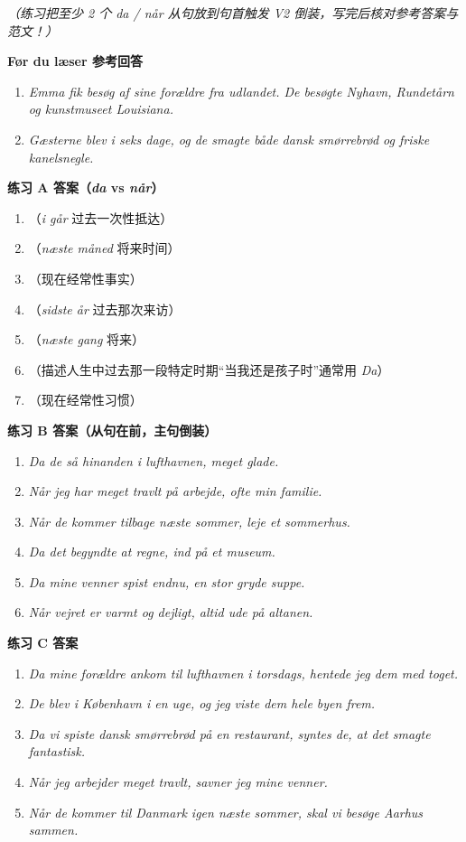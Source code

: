 \textit{（练习把至少 2 个 \textit{da / når} 从句放到句首触发 V2 倒装，写完后核对参考答案与范文！）}

\begin{answerbox}
\textbf{Før du læser 参考回答}
\begin{enumerate}
  \item \textit{Emma fik besøg af sine forældre fra udlandet. De besøgte Nyhavn, Rundetårn og kunstmuseet Louisiana.}
  \item \textit{Gæsterne blev i seks dage, og de smagte både dansk smørrebrød og friske kanelsnegle.}
\end{enumerate}

\textbf{练习 A 答案（\textit{da} vs \textit{når}）}
\begin{enumerate}
  \item {}（\textit{i går} 过去一次性抵达）
  \item {}（\textit{næste måned} 将来时间）
  \item {}（现在经常性事实）
  \item {}（\textit{sidste år} 过去那次来访）
  \item {}（\textit{næste gang} 将来）
  \item {}（描述人生中过去那一段特定时期“当我还是孩子时”通常用 \textit{Da}）
  \item {}（现在经常性习惯）
\end{enumerate}

\textbf{练习 B 答案（从句在前，主句倒装）}
\begin{enumerate}
  \item \textit{Da de så hinanden i lufthavnen,  meget glade.}
  \item \textit{Når jeg har meget travlt på arbejde,  ofte min familie.}
  \item \textit{Når de kommer tilbage næste sommer,  leje et sommerhus.}
  \item \textit{Da det begyndte at regne,  ind på et museum.}
  \item \textit{Da mine venner  spist endnu,  en stor gryde suppe.}
  \item \textit{Når vejret er varmt og dejligt,  altid ude på altanen.}
\end{enumerate}

\textbf{练习 C 答案}
\begin{enumerate}
  \item \textit{Da mine forældre ankom til lufthavnen i torsdags, hentede jeg dem med toget.}
  \item \textit{De blev i København i en uge, og jeg viste dem hele byen frem.}
  \item \textit{Da vi spiste dansk smørrebrød på en restaurant, syntes de, at det smagte fantastisk.}
  \item \textit{Når jeg arbejder meget travlt, savner jeg mine venner.}
  \item \textit{Når de kommer til Danmark igen næste sommer, skal vi besøge Aarhus sammen.}
\end{enumerate}


\end{answerbox}
